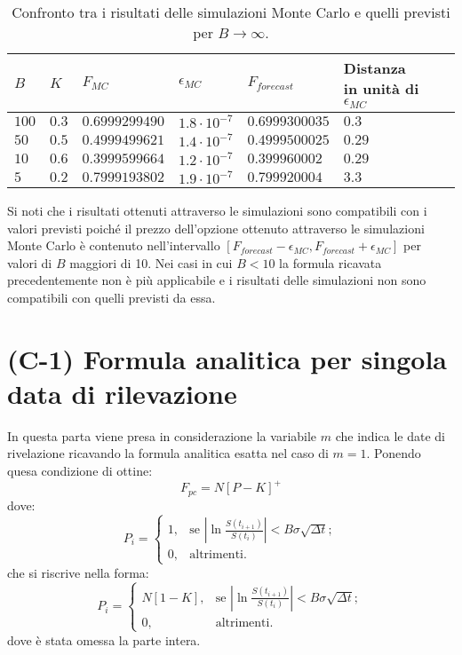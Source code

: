 \begin{itemize}
    \begin{table}[t]
\small
\centering
\begin{tabular}{|l|l|l|l|l|l|l|l|}
\hline
$B$ & $K$ & $F_{MC}$ & $\epsilon_{MC}$ & $F_{forecast}$ & Distanza in unità di $\epsilon_{MC}$ \\
\hline \hline
$100$ & $0.3$ & $0.6999299490$ & $1.8 \cdot 10^{-7}$ &
$0.6999300035$ & $0.3$\\ \hline
$50$ & $0.5$ & $0.4999499621$ & $1.4 \cdot 10^{-7}$ & $0.4999500025$ & $0.29$\\ \hline
$10$ & $0.6$ & $0.3999599664$ & $1.2 \cdot 10^{-7}$ & $0.399960002$ & $0.29$\\ \hline
$5$ & $0.2$ & $0.7999193802$ & $1.9 \cdot 10^{-7}$ & $0.799920004$ & $3.3$\\ \hline
\end{tabular}
\caption{Confronto tra i risultati delle simulazioni Monte Carlo e quelli previsti per $B \rightarrow \infty$.}
\label{tab:Teo-MC_B}
\end{table}
\end{itemize}

Si noti che i risultati ottenuti attraverso le simulazioni sono compatibili con i valori previsti poiché il prezzo dell'opzione ottenuto attraverso le simulazioni Monte Carlo è contenuto nell'intervallo $[F_{forecast}-\epsilon_{MC},F_{forecast}+\epsilon_{MC}]$ per valori di $B$ maggiori di 10. Nei casi in cui $B<10$ la formula ricavata precedentemente non è più applicabile e i risultati delle simulazioni non sono compatibili con quelli previsti da essa.

\section{(C-1) Formula analitica per singola data di rilevazione}

In questa parta viene presa in considerazione la variabile $m$ che indica le date di rivelazione ricavando la formula analitica esatta nel caso di $m=1$. Ponendo quesa condizione di ottine:
\begin{equation}
    F_{pc}=N[P-K]^{+}
\end{equation}
dove:
\begin{equation}
    P_i = \begin{cases}
    1, & \text{se} \,\,\left| \ln{\frac{S(t_{i+1})}{S(t_i)}} \right| < B \sigma \sqrt{\Delta t};\\
    0, & \text{altrimenti}.
    \label{eq:pc_condition}
  \end{cases}
\end{equation}
che si riscrive nella forma:
\begin{equation}
    P_i = \begin{cases}
    N[1-K], & \text{se} \,\,\left| \ln{\frac{S(t_{i+1})}{S(t_i)}} \right| < B \sigma \sqrt{\Delta t};\\
    0, & \text{altrimenti}.
  \end{cases}
\end{equation}
dove è stata omessa la parte intera.

